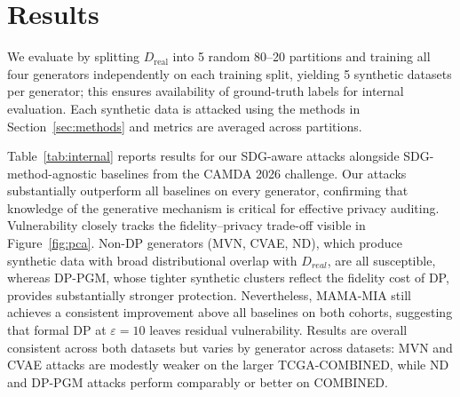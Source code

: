 \documentclass[11pt]{article}
\begin{document}
\section{Results}\label{sec:results}
We evaluate by splitting $D_{\text{real}}$ into 5 random 80--20 partitions and training all four generators independently on each training split, yielding 5 synthetic datasets per generator; this ensures availability of ground-truth labels for internal evaluation. Each  synthetic data is attacked using the methods in Section~\ref{sec:methods} and metrics are averaged across partitions.

Table~\ref{tab:internal} reports results for our SDG-aware attacks alongside SDG-method-agnostic baselines from the CAMDA 2026 challenge. Our attacks substantially outperform all baselines on every generator, confirming that knowledge of the generative mechanism is critical for effective privacy auditing. Vulnerability closely tracks the fidelity--privacy trade-off visible in Figure~\ref{fig:pca}. Non-DP generators (MVN, CVAE, ND), which produce synthetic data with broad distributional overlap with $D_{{real}}$, are all susceptible, whereas DP-PGM, whose tighter synthetic clusters reflect the fidelity cost of DP, provides substantially stronger protection. Nevertheless, \textsc{MAMA-MIA} still achieves a consistent improvement above all baselines on both cohorts, suggesting that formal DP at $\varepsilon = 10$ leaves residual vulnerability. Results are overall consistent across both datasets  but varies by generator across datasets:  MVN and CVAE attacks are modestly weaker on the larger TCGA-COMBINED, while ND and DP-PGM attacks perform comparably or better on COMBINED.
\end{document}
